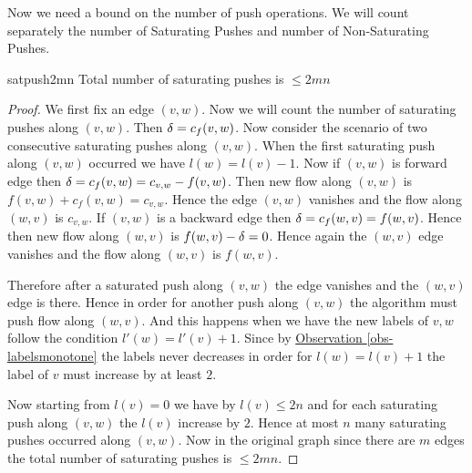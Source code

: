 Now we need a bound on the number of push operations. We will count separately the number of Saturating Pushes and number of Non-Saturating Pushes.
\begin{lemma}{}{satpush2mn}
	Total number of saturating pushes is $\leq 2mn$
\end{lemma}
\begin{proof}
	We first fix an edge $(v,w)$. Now we will count the number of saturating pushes along $(v,w)$. Then $\delta=c_f(v,w)$.  Now consider the scenario of  two consecutive saturating pushes along $(v,w)$. When the first saturating push along $(v,w)$ occurred we have $l(w)=l(v)-1$. Now if $(v,w)$ is forward edge then $\delta=c_f(v,w)=c_{v,w}-f(v,w)$. Then new flow along $(v,w)$ is $f(v,w)+c_f(v,w)=c_{v,w}$. Hence the edge $(v,w)$ vanishes and the flow along $(w,v)$ is $c_{v,w}$. If $(v,w)$ is a backward edge then $\delta=c_f(w,v)=f(w,v)$. Hence then new flow along $(w,v)$ is $f(w,v)-\delta=0$. Hence again the $(w,v)$ edge vanishes and the flow along $(w,v)$ is $f(w,v)$. 
	
	\begin{center}
	\end{center}
	
	 Therefore after a saturated push along $(v,w)$ the edge vanishes and the $(w,v)$ edge is there. Hence in order for another push along $(v,w)$ the algorithm must push flow along $(w,v)$. And this happens when we have the new labels of $v,w$ follow the condition $l'(w)=l'(v)+1$. Since by \hyperref[obs-labelsmonotone]{Observation \ref{obs-labelsmonotone}} the labels never decreases in order for $l(w)=l(v)+1$ the label of $v$ must  increase  by at least $2$.
	
	Now starting from $l(v)=0$ we have by  $l(v)\leq 2n$ and for each saturating push along $(v,w)$ the $l(v)$ increase by $2$. Hence at most $n$ many saturating pushes occurred along $(v,w)$. Now in the original graph since there are $m$ edges the total number of saturating pushes is $\leq 2mn$. 
\end{proof}


